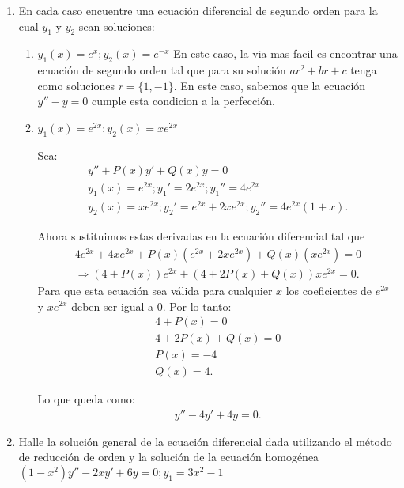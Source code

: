 \begin{enumerate}
      \item En cada caso encuentre una ecuación diferencial de segundo orden para la cual $y_1$ y $y_2$ sean soluciones:
	\begin{enumerate}
	  \item $y_1\left( x \right) = e^{x};y_2\left( x \right) =e^{-x}$ 
	    En este caso, la via mas facil es encontrar una ecuación de segundo orden tal que para su solución $ar^2+br+c$ tenga como soluciones $r=\{1,-1\}$. En este caso, sabemos que la ecuación $y''-y = 0$ cumple esta condicion a la perfección. 
	  \item $y_1\left( x \right) = e^{2x};y_2\left( x \right) = xe^{2x}$

	    Sea:
	    \begin{align*}
	      y''+P\left( x \right) y' + Q\left( x \right) y = 0\\
	      y_1\left( x \right) = e^{2x};y_1'=2e^{2x};y_1''=4e^{2x}\\
	      y_2\left( x \right) = xe^{2x};y_2'=e^{2x}+2xe^{2x};y_2''=4e^{2x}\left( 1+x \right) 
	    .\end{align*}

	    Ahora sustituimos estas derivadas en la ecuación diferencial tal que 
	    \begin{align*}
	      4e^{2x}+4xe^{2x}+P\left( x \right) \left( e^{2x}+2xe^{2x} \right) + Q\left( x \right) \left( xe^{2x} \right) = 0\\
	      \Rightarrow \left( 4+P\left( x \right)  \right) e^{2x}+\left( 4+2P\left( x \right) + Q\left( x \right)  \right) xe^{2x}=0
	    .\end{align*}
	    Para que esta ecuación sea válida para cualquier $x$ los coeficientes de $e^{2x}$ y $xe^{2x}$ deben ser igual a $0$. Por lo tanto:
	    \begin{align*}
	      4+P\left( x \right) = 0\\
	      4+2P\left( x \right) + Q\left( x \right) = 0\\
	      P\left( x \right) = -4\\
	      Q\left( x \right) = 4
	    .\end{align*}

	    Lo que queda como:
	    \begin{align*}
	      y'' - 4y' + 4y = 0
	    .\end{align*}
	\end{enumerate}
      \item Halle la solución general de la ecuación diferencial dada utilizando el método de reducción de orden y la solución de la ecuación homogénea $\left( 1-x^2 \right) y''-2xy'+6y = 0; y_1=3x^2-1$ 


\end{enumerate}

